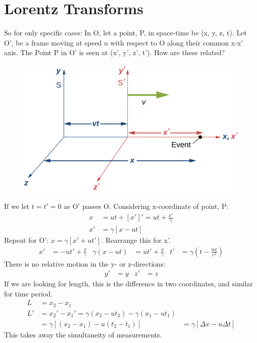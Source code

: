 \documentclass[a4paper, 11pt, normalem]{report}
\begin{document}
\section{Lorentz Transforms}
So for only specific cases: 
In O, let a point, P, in space-time be (x, y, z, t).
Let O', be a frame moving at speed u with respect to O along their common x-x' axis.
The Point P in O' is seen at (x', y', z', t').
How are these related?
\begin{figure}[H]
    \centering
    \includegraphics{Axes.jpg}
\end{figure}
If we let $t = t' = 0$ as O' passes O.
Considering x-coordinate of point, P:
\begin{align}
    x &= ut + [x']' = ut + \frac{x'}{\gamma} \\
    x' &= \gamma [x - ut]
\end{align}
Repeat for O': $x = \gamma [x' + ut']$.
Rearrange this for x'.
\begin{align}
    x' &= -ut' + \frac{x}{\gamma} & \gamma(x - ut) &= ut' + \frac{x}{\gamma} & t' &= \gamma(t - \frac{ux}{c^{2}})
\end{align}
There is no relative motion in the y- or z-directions:
\begin{align}
    y' &= y & z' &= z
\end{align}
If we are looking for length, this is the difference in two coordinates, and similar for time period.
\begin{align}
    L &= x_{2} - x_{1} \\
    L' &= x_{2}' - x_{1}' = \gamma(x_{2} - ut_{2}) - \gamma(x_{1} - ut_{1}) \\
       &= \gamma[(x_{2} - x_{1}) - u(t_{2} - t_{1})] &= \gamma[\Delta x - u\Delta t]
\end{align}
This takes away the simultaneity of measurements.
\end{document}
